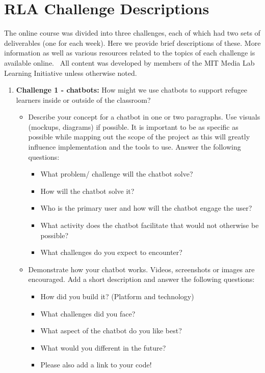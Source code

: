 \documentclass[12pt,twoside,vi]{mitthesis}
\begin{document}
\appendix

\chapter{RLA Challenge Descriptions}

The online course was divided into three challenges, each of which had two sets of deliverables (one for each week). Here we provide brief descriptions of these. More information as well as various resources related to the topics of each challenge is available online.~\cite{rla} All content was developed by members of the MIT Media Lab Learning Initiative unless otherwise noted.

\begin{enumerate}
\item \textbf{Challenge 1 - chatbots:} How might we use chatbots to support refugee learners inside or outside of the classroom? 
\begin{itemize}
\item Describe your concept for a chatbot in one or two paragraphs. Use visuals (mockups, diagrams) if possible. It is important to be as specific as possible while mapping out the scope of the project as this will greatly influence implementation and the tools to use. Answer the following questions:
\begin{itemize}
\item What problem/ challenge will the chatbot solve? 
\item How will the chatbot solve it? 
\item Who is the primary user and how will the chatbot engage the user?
\item What activity does the chatbot facilitate that would not otherwise be possible? 
\item What challenges do you expect to encounter?
\end{itemize}
\item Demonstrate how your chatbot works. Videos, screenshots or images are encouraged. Add a short description and answer the following questions: 
\begin{itemize}
\item How did you build it? (Platform and technology)
\item What challenges did you face?
\item What aspect of the chatbot do you like best? 
\item What would you different in the future? 
\item Please also add a link to your code!

\end{itemize}
\end{itemize}
\end{enumerate}
\end{document}
